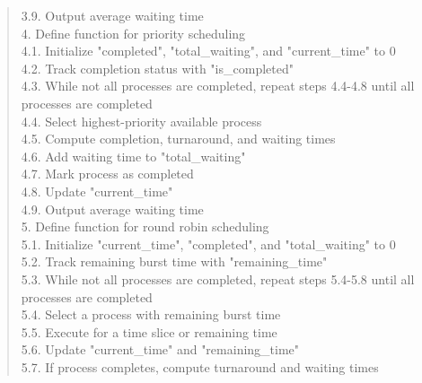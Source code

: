 \documentclass[a4paper, 12pt]{article}
\begin{document}
\begin{quote}
\hspace*{1cm} 3.9. Output average waiting time\\
4. Define function for priority scheduling\\
\hspace*{1cm} 4.1. Initialize "completed", "total\_waiting", and "current\_time" to 0\\
\hspace*{1cm} 4.2. Track completion status with "is\_completed"\\
\hspace*{1cm} 4.3. While not all processes are completed, repeat steps 4.4-4.8 until all processes are completed\\
\hspace*{1cm} 4.4. Select highest-priority available process\\
\hspace*{1cm} 4.5. Compute completion, turnaround, and waiting times\\
\hspace*{1cm} 4.6. Add waiting time to "total\_waiting"\\
\hspace*{1cm} 4.7. Mark process as completed\\
\hspace*{1cm} 4.8. Update "current\_time"\\
\hspace*{1cm} 4.9. Output average waiting time\\
5. Define function for round robin scheduling\\
\hspace*{1cm} 5.1. Initialize "current\_time", "completed", and "total\_waiting" to 0\\
\hspace*{1cm} 5.2. Track remaining burst time with "remaining\_time"\\
\hspace*{1cm} 5.3. While not all processes are completed, repeat steps 5.4-5.8 until all processes are completed\\
\hspace*{1cm} 5.4. Select a process with remaining burst time\\
\hspace*{1cm} 5.5. Execute for a time slice or remaining time\\
\hspace*{1cm} 5.6. Update "current\_time" and "remaining\_time"\\
\hspace*{1cm} 5.7. If process completes, compute turnaround and waiting times\\

\end{quote}
\end{document}
